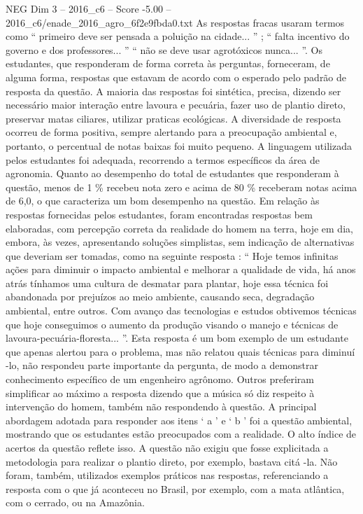 \begin{textsample}{NEG Dim 3 – 2016\_c6 – Score -5.00 – 2016\_c6/enade\_2016\_agro\_6f2e9fbda0.txt}
As respostas fracas usaram termos como “ primeiro deve ser pensada a poluição na cidade... ” ; “ falta incentivo do governo e dos professores... ” “ não se deve usar agrotóxicos nunca... ”.
Os estudantes, que responderam de forma correta às perguntas, forneceram, de alguma forma, respostas que estavam de acordo com o esperado pelo padrão de resposta da questão.
A maioria das respostas foi sintética, precisa, dizendo ser necessário maior interação entre lavoura e pecuária, fazer uso de plantio direto, preservar matas ciliares, utilizar praticas ecológicas.
A diversidade de resposta ocorreu de forma positiva, sempre alertando para a preocupação ambiental e, portanto, o percentual de notas baixas foi muito pequeno.
A linguagem utilizada pelos estudantes foi adequada, recorrendo a termos específicos da área de agronomia.
Quanto ao desempenho do total de estudantes que responderam à questão, menos de 1 \% recebeu nota zero e acima de 80 \% receberam notas acima de 6,0, o que caracteriza um bom desempenho na questão.
Em relação às respostas fornecidas pelos estudantes, foram encontradas respostas bem elaboradas, com percepção correta da realidade do homem na terra, hoje em dia, embora, às vezes, apresentando soluções simplistas, sem indicação de alternativas que deveriam ser tomadas, como na seguinte resposta : “ Hoje temos infinitas ações para diminuir o impacto ambiental e melhorar a qualidade de vida, há anos atrás tínhamos uma cultura de desmatar para plantar, hoje essa técnica foi abandonada por prejuízos ao meio ambiente, causando seca, degradação ambiental, entre outros.
Com avanço das tecnologias e estudos obtivemos técnicas que hoje conseguimos o aumento da produção visando o manejo e técnicas de lavoura-pecuária-floresta... ”.
Esta resposta é um bom exemplo de um estudante que apenas alertou para o problema, mas não relatou quais técnicas para diminuí -lo, não respondeu parte importante da pergunta, de modo a demonstrar conhecimento específico de um engenheiro agrônomo.
Outros preferiram simplificar ao máximo a resposta dizendo que a música só diz respeito à intervenção do homem, também não respondendo à questão.
A principal abordagem adotada para responder aos itens ‘ a ’ e ‘ b ’ foi a questão ambiental, mostrando que os estudantes estão preocupados com a realidade.
O alto índice de acertos da questão reflete isso.
A questão não exigiu que fosse explicitada a metodologia para realizar o plantio direto, por exemplo, bastava citá -la.
Não foram, também, utilizados exemplos práticos nas respostas, referenciando a resposta com o que já aconteceu no Brasil, por exemplo, com a mata atlântica, com o cerrado, ou na Amazônia.

\end{textsample}
